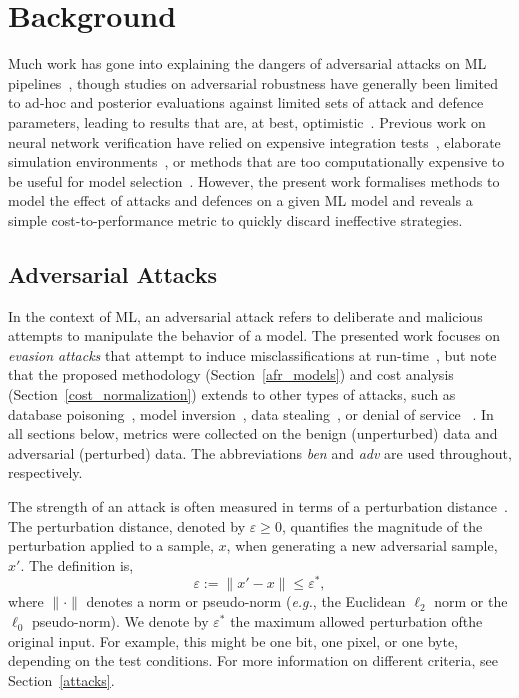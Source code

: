 \section{Background}

Much work has gone into explaining the dangers of adversarial attacks on ML pipelines~\cite{carlini_towards_2017,croce_reliable_2020,pixelattack,fgm,biggio_evasion_2013}, though studies on adversarial robustness have generally been limited to ad-hoc and posterior evaluations against limited sets of attack and defence parameters, leading to results that are, at best, optimistic~\cite{meyers,ma2020imbalanced}. Previous work on neural network verification have relied on expensive integration tests~\cite{vehicle_testing_review}, elaborate simulation environments~\cite{vehicle_formal}, or methods that are too computationally expensive to be useful for model selection~\cite{formal_adversarial}. 
However, the present work formalises methods to model the effect of attacks and defences on a given ML model and reveals a simple cost-to-performance metric to quickly discard ineffective strategies.


\subsection{Adversarial Attacks}

In the context of ML, an adversarial attack refers to deliberate and malicious attempts to manipulate the behavior of a model. The presented work focuses on \textit{evasion attacks} that attempt to induce misclassifications at run-time~\cite{carlini_towards_2017,biggio_evasion_2013}, but note that the proposed methodology (Section~\ref{afr_models}) and cost analysis (Section~\ref{cost_normalization}) extends to other types of attacks, such as database poisoning~\cite{biggio_poisoning_2013,saha2020hidden}, model inversion~\cite{choquette2021label,li2021membership}, data stealing~\cite{orekondy2019knockoff}, or denial of service ~\cite{santos2021universal}. In all sections below, metrics were collected on the benign (unperturbed) data and adversarial (perturbed) data. The abbreviations \textit{ben} and \textit{adv} are used throughout, respectively.

The strength of an attack is often measured in terms of a perturbation distance~\cite{croce_reliable_2020,chakraborty_adversarial_2018,pixelattack}. The perturbation distance, denoted by $\varepsilon\geq0$, quantifies the magnitude of the perturbation applied to a sample, $x$, when generating a new adversarial sample, $x'$. The definition is,
\begin{equation}
    \varepsilon := \| x' - x \| \leq \varepsilon^*,
    \label{eq:perturbation_distance}
\end{equation}
where $\| \cdot \|$ denotes a norm or pseudo-norm (\textit{e.g.}, the Euclidean $\ell_2$ norm or the $\ell_0$ pseudo-norm). We denote by $\varepsilon^*$ the maximum allowed perturbation ofthe original input. For example, this might be one bit, one pixel, or one byte, depending on the test conditions. For more information on different criteria, see Section~\ref{attacks}.


